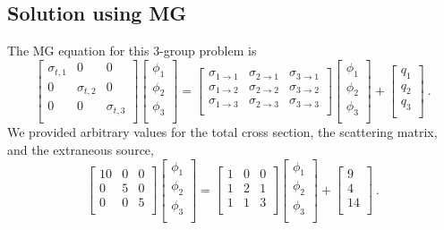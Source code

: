 \documentclass{anstrans}
\begin{document}
\subsection{Solution using MG}
The MG equation for this 3-group problem is
\begin{equation*}
\begin{bmatrix}
\sigma_{t,1} & 0 & 0\\
0  & \sigma_{t,2} & 0\\
0 & 0 & \sigma_{t,3}\\
\end{bmatrix}
\begin{bmatrix}
\phi_1\\
\phi_2\\
\phi_3\\
\end{bmatrix}
=
\begin{bmatrix}
\sigma_{1 \to 1} & \sigma_{2 \to 1} & \sigma_{3 \to 1}\\
\sigma_{1 \to 2} & \sigma_{2 \to 2} & \sigma_{3 \to 2}\\
\sigma_{1 \to 3} & \sigma_{2 \to 3} & \sigma_{3 \to 3}\\
\end{bmatrix}
\begin{bmatrix}
\phi_1\\
\phi_2\\
\phi_3\\
\end{bmatrix}
+
\begin{bmatrix}
q_1\\
q_2\\
q_3\\
\end{bmatrix} \: .
\end{equation*}
We provided arbitrary values for the total cross section, the scattering matrix, and the extraneous source,
\begin{equation*}
\begin{bmatrix}
10 & 0 & 0\\
0  & 5 & 0\\
0 & 0 & 5 \\
\end{bmatrix}
\begin{bmatrix}
\phi_1\\
\phi_2\\
\phi_3\\
\end{bmatrix}
=
\begin{bmatrix}
1 & 0 & 0 \\
1 & 2 & 1 \\
1 & 1 & 3 \\
\end{bmatrix}
\begin{bmatrix}
\phi_1\\
\phi_2\\
\phi_3\\
\end{bmatrix}
+
\begin{bmatrix}
9\\
4\\
14\\
\end{bmatrix} \: .
\end{equation*}
\end{document}
